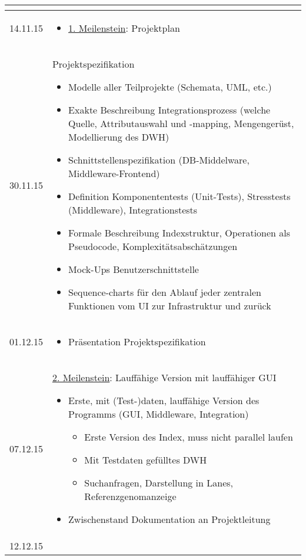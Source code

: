 \documentclass{scrartcl}
\begin{document}
\begin{longtable}{| l | p{14cm} |}
\begin{itemize}
\end{itemize}\\
\hline
14.11.15 & \begin{itemize}
 \item \underline{1. Meilenstein}: Projektplan
\end{itemize}\\
\hline
30.11.15 & Projektspezifikation
\begin{itemize}
  \item Modelle aller Teilprojekte (Schemata, UML, etc.) 
  \item Exakte Beschreibung Integrationsprozess (welche Quelle, Attributauswahl und -mapping,  Mengengerüst, Modellierung des DWH)
  \item Schnittstellenspezifikation (DB-Middelware, Middleware-Frontend)
  \item Definition Komponententests (Unit-Tests), Stresstests (Middleware), Integrationstests
  \item Formale Beschreibung Indexstruktur, Operationen als Pseudocode, Komplexitätsabschätzungen
  \item Mock-Ups Benutzerschnittstelle
  \item Sequence-charts für den Ablauf jeder zentralen Funktionen vom UI zur Infrastruktur und zurück
\end{itemize}\\
\hline
01.12.15 & \begin{itemize}
 \item Präsentation Projektspezifikation
\end{itemize}\\
\hline
07.12.15 & \underline{2. Meilenstein}: Lauffähige Version mit lauffähiger GUI
\begin{itemize}
 \item Erste, mit (Test-)daten, lauffähige Version des Programms (GUI, Middleware, Integration)
 \begin{itemize} 
  \item Erste Version des Index, muss nicht parallel laufen
  \item Mit Testdaten gefülltes DWH
  \item Suchanfragen, Darstellung in Lanes, Referenzgenomanzeige
 \end{itemize}
 \item Zwischenstand Dokumentation an Projektleitung
\end{itemize}\\
\hline
12.12.15 & \begin{itemize}

\end{itemize}
\end{longtable}
\end{document}
